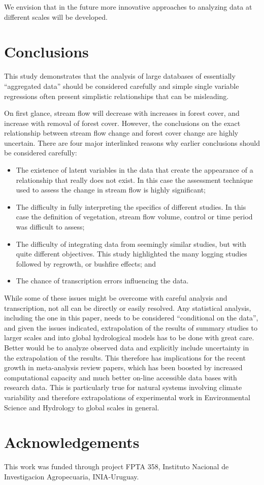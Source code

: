 \documentclass[]{elsarticle} %
\providecommand{\tightlist}{%
  \setlength{\itemsep}{0pt}\setlength{\parskip}{0pt}}
\begin{document}
We envision that in the future more innovative approaches to analyzing data at different scales will be developed.

\hypertarget{conclusions}{%
\section{Conclusions}\label{conclusions}}

This study demonstrates that the analysis of large databases of essentially ``aggregated data'' should be considered carefully and simple single variable regressions often present simplistic relationships that can be misleading.

On first glance, stream flow will decrease with increases in forest cover, and increase with removal of forest cover. However, the conclusions on the exact relationship between stream flow change and forest cover change are highly uncertain. There are four major interlinked reasons why earlier conclusions should be considered carefully:

\begin{itemize}
\tightlist
\item
  The existence of latent variables in the data that create the appearance of a relationship that really does not exist. In this case the assessment technique used to assess the change in stream flow is highly significant;\\
\item
  The difficulty in fully interpreting the specifics of different studies. In this case the definition of vegetation, stream flow volume, control or time period was difficult to assess;\\
\item
  The difficulty of integrating data from seemingly similar studies, but with quite different objectives. This study highlighted the many logging studies followed by regrowth, or bushfire effects; and\\
\item
  The chance of transcription errors influencing the data.
\end{itemize}

While some of these issues might be overcome with careful analysis and transcription, not all can be directly or easily resolved. Any statistical analysis, including the one in this paper, needs to be considered ``conditional on the data'', and given the issues indicated, extrapolation of the results of summary studies to larger scales and into global hydrological models has to be done with great care. Better would be to analyze observed data and explicitly include uncertainty in the extrapolation of the results. This therefore has implications for the recent growth in meta-analysis review papers, which has been boosted by increased computational capacity and much better on-line accessible data bases with research data. This is particularly true for natural systems involving climate variability and therefore extrapolations of experimental work in Environmental Science and Hydrology to global scales in general.

\hypertarget{acknowledgements}{%
\section{Acknowledgements}\label{acknowledgements}}

This work was funded through project FPTA 358, Instituto Nacional de Investigacion Agropecuaria, INIA-Uruguay.

\renewcommand\refname{References}

\end{document}

